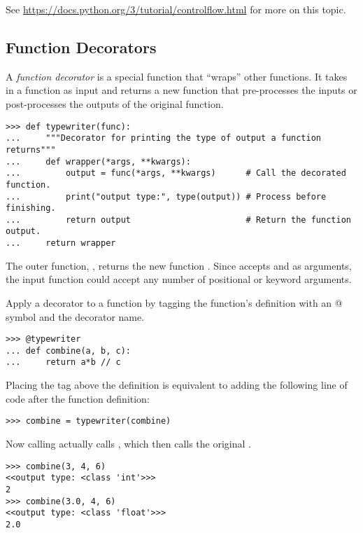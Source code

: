 See \url{https://docs.python.org/3/tutorial/controlflow.html} for more on this topic.

\subsection*{Function Decorators} %

A \emph{function decorator} is a special function that ``wraps'' other functions.
It takes in a function as input and returns a new function that pre-processes the inputs or post-processes the outputs of the original function.

\begin{lstlisting}
>>> def typewriter(func):
...     """Decorator for printing the type of output a function returns"""
...     def wrapper(*args, **kwargs):
...         output = func(*args, **kwargs)      # Call the decorated function.
...         print("output type:", type(output)) # Process before finishing.
...         return output                       # Return the function output.
...     return wrapper
\end{lstlisting}

The outer function, , returns the new function .
Since  accepts  and  as arguments, the input function  could accept any number of positional or keyword arguments.

Apply a decorator to a function by tagging the function's definition with an @ symbol and the decorator name.

\begin{lstlisting}
>>> @typewriter
... def combine(a, b, c):
...     return a*b // c
\end{lstlisting}

Placing the tag above the definition is equivalent to adding the following line of code after the function definition:

\begin{lstlisting}
>>> combine = typewriter(combine)
\end{lstlisting}

Now calling  actually calls , which then calls the original .

\begin{lstlisting}
>>> combine(3, 4, 6)
<<output type: <class 'int'>>>
2
>>> combine(3.0, 4, 6)
<<output type: <class 'float'>>>
2.0
\end{lstlisting}

